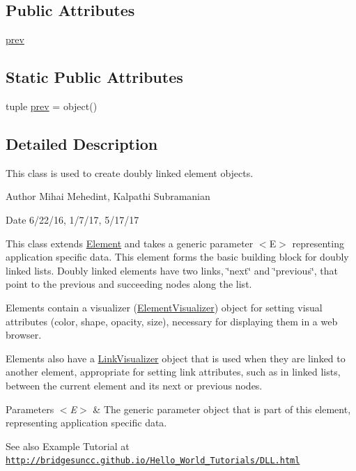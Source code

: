 \subsection*{Public Attributes}
\begin{DoxyCompactItemize}
\item 
\hyperlink{class_d_lelement_1_1_d_lelement_a14bf836d9e64de3f407da9bb7ba93622}{prev}
\end{DoxyCompactItemize}
\subsection*{Static Public Attributes}
\begin{DoxyCompactItemize}
\item 
tuple \hyperlink{class_d_lelement_1_1_d_lelement_afc081f21482fb230610ba211d07abe18}{prev} = object()
\end{DoxyCompactItemize}


\subsection{Detailed Description}
This class is used to create doubly linked element objects. 

\begin{DoxyAuthor}{Author}
Mihai Mehedint, Kalpathi Subramanian
\end{DoxyAuthor}
\begin{DoxyDate}{Date}
6/22/16, 1/7/17, 5/17/17
\end{DoxyDate}
This class extends \hyperlink{namespace_element}{Element} and takes a generic parameter $<$\+E$>$ representing application specific data. This element forms the basic building block for doubly linked lists. Doubly linked elements have two links, \char`\"{}next\char`\"{} and \char`\"{}previous\char`\"{}, that point to the previous and succeeding nodes along the list.

Elements contain a visualizer (\hyperlink{namespace_element_visualizer}{Element\+Visualizer}) object for setting visual attributes (color, shape, opacity, size), necessary for displaying them in a web browser.

Elements also have a \hyperlink{namespace_link_visualizer}{Link\+Visualizer} object that is used when they are linked to another element, appropriate for setting link attributes, such as in linked lists, between the current element and its next or previous nodes.


\begin{DoxyParams}{Parameters}
{\em $<$\+E$>$} & The generic parameter object that is part of this element, representing application specific data.\\
\hline
\end{DoxyParams}
\begin{DoxySeeAlso}{See also}
Example Tutorial at ~\newline
 \href{http://bridgesuncc.github.io/Hello_World_Tutorials/DLL.html}{\tt http\+://bridgesuncc.\+github.\+io/\+Hello\+\_\+\+World\+\_\+\+Tutorials/\+D\+L\+L.\+html} 
\end{DoxySeeAlso}


